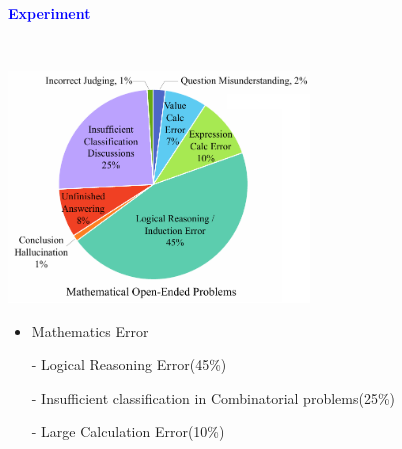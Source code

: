 \documentclass[professionalfont]{beamer}
\begin{document}
\begin{frame}
\begin{center}
    { \textbf{\textcolor{blue}{ {\fontsize{12}{14}\selectfont Experiment} }} }
\end{center}
\\[0.2cm]

\begin{center}
    \includegraphics[width=0.6\textwidth]{figure4-1.png}
\end{center}

{\fontsize{10}{14}\selectfont 
\begin{itemize}
    \item Mathematics Error

    - Logical Reasoning Error(45\%)
    
    - Insufficient classification in Combinatorial problems(25\%)
    
    - Large Calculation Error(10\%)
    
\end{itemize}
}

\end{frame}
\end{document}
